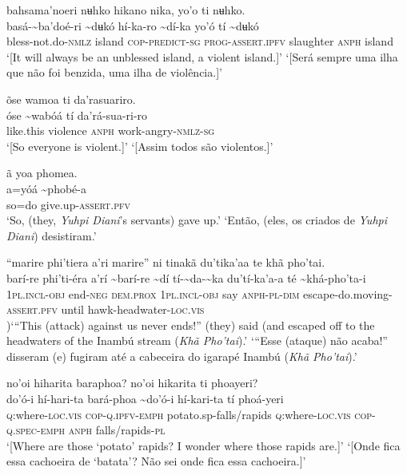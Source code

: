 \documentclass[output=paper,
modfonts,nonflat
]{langsci/langscibook}
\begin{document}
\ea bahsama'noeri nʉhko hikano nika, yo'o ti nʉhko. \\[.3em]
\gll basá-{\textasciitilde}ba'doé-ri	{\textasciitilde}dʉkó	hí-ka-ro	{\textasciitilde}dí-ka	yo'ó	tí	{\textasciitilde}dʉkó \\
     bless-not.do\textsc{-nmlz}	island	\textsc{cop-predict-sg}	\textsc{prog-assert.ipfv}	slaughter	\textsc{anph}	island\\
\glt ‘[It will always be an unblessed island, a violent island.]’
\glt ‘[Será sempre uma ilha que não foi benzida, uma ilha de violência.]’
\z 

\newpage 
\ea õse wamoa ti da'rasuariro. \\[.3em]
\gll {\textasciitilde}óse	{\textasciitilde}wabóá	tí	da'rá-sua{\footnotemark}-ri-ro \\
     like.this	violence	\textsc{anph}	work-angry\textsc{-nmlz-sg}\\
\glt ‘[So everyone is violent.]’
\glt ‘[Assim todos são violentos.]’
\z 

\ea ã yoa phomea.  \\[.3em]
\gll {\textasciitilde}a=yóá	{\textasciitilde}phobé-a \\
     so=do	give.up-\textsc{assert.pfv}\\
\glt ‘So, (they, \textit{Yuhpi Diani}'s servants) gave up.’ 
\glt ‘Então, (eles, os criados de \textit{Yuhpi Diani}) desistiram.’
\z 

\ea “marire phi'tiera a’ri marire” ni tinakã du'tika'aa te khã pho'tai. \\[.3em]
\gll {\textasciitilde}barí-re	phi'ti-éra	a’rí	{\textasciitilde}barí-re	{\textasciitilde}dí tí-{\textasciitilde}da-{\textasciitilde}ka	du'tí-ka'a-a	té	{\textasciitilde}khá-pho'ta-i\\
     1\textsc{pl.incl-obj}	end\textsc{-neg}	\textsc{dem.prox}	1\textsc{pl.incl-obj}	say \textsc{anph-pl-dim}	escape-do.moving-\textsc{assert.pfv}	until	hawk-headwater\textsc{-loc.vis}\\
)\glt ‘“This (attack) against us never ends!” (they) said (and escaped off to the headwaters of the Inambú stream (\textit{Khã Pho'tai}).’
\glt ‘“Esse (ataque) não acaba!” disseram (e) fugiram até a cabeceira do igarapé Inambú (\textit{Khã Pho'tai}).’
\z

\ea no'oi hiharita baraphoa? no'oi hikarita ti phoayeri? \\[.3em]
\gll {\textasciitilde}do'ó-i	hí-hari-ta	bará-phoa {\textasciitilde}do'ó-i	hí-kari-ta	tí	phoá-yeri \\
     \textsc{q:}where\textsc{-loc.vis}	\textsc{cop-q.ipfv-emph}	potato.sp-falls/rapids \textsc{q:}where\textsc{-loc.vis}	\textsc{cop-q.spec-emph}	\textsc{anph}	falls/rapids\textsc{-pl}\\
\glt ‘[Where are those ‘potato’ rapids?{\footnotemark} I wonder where those rapids are.]’
\glt ‘[Onde fica essa cachoeira de ‘batata’? Não sei onde fica essa cachoeira.]’
\z 
\end{document}
